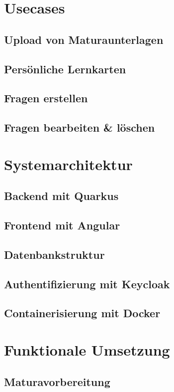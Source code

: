 \section{Usecases}

\subsection{Upload von Maturaunterlagen}
\subsection{Persönliche Lernkarten}
\subsection{Fragen erstellen}
\subsection{Fragen bearbeiten \& löschen}

\section{Systemarchitektur}
\subsection{Backend mit Quarkus}
\subsection{Frontend mit Angular}
\subsection{Datenbankstruktur}
\subsection{Authentifizierung mit Keycloak}
\subsection{Containerisierung mit Docker}


\section{Funktionale Umsetzung}
\subsection{Maturavorbereitung}
